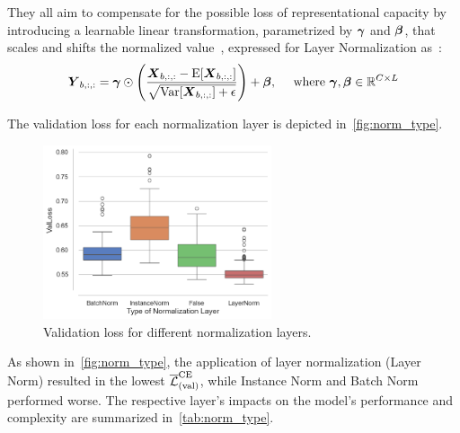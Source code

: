 They all aim to compensate for the possible loss of representational capacity by introducing a learnable linear
transformation, parametrized by \( \boldsymbol{\gamma} \) and \( \boldsymbol{\beta} \),
that scales and shifts the normalized value~\cite{wu2018group}, expressed for Layer Normalization as~\cite{PyTorchLayerNorm}:
\begin{equation}
    \boldsymbol{Y}_{b, :, :} = \boldsymbol{\gamma} \odot \left( \frac{\boldsymbol{X}_{b, :, :} - \mathrm{E}[\boldsymbol{X}_{b, :, :}]}{\sqrt{\operatorname{Var}[\boldsymbol{X}_{b, :, :}] + \epsilon}} \right) + \boldsymbol{\beta}, \quad \text { where } \boldsymbol{\gamma}, \boldsymbol{\beta} \in \mathbb{R}^{C \times L}
\end{equation}

The validation loss for each normalization layer is depicted in~\autoref{fig:norm_type}.
\begin{figure}[H]
    \centering
    \includegraphics[width=0.6\textwidth]{figures/06_ModelExploration/4_CNN/conv_norm_type.png}
    \caption{Validation loss for different normalization layers.}
    \label{fig:norm_type}
\end{figure}

As shown in~\autoref{fig:norm_type}, the application of layer normalization (Layer Norm) resulted in the lowest \( \overline{\mathcal{L}}_{(\text{val})}^{\text{CE}} \),
while Instance Norm and Batch Norm performed worse. The respective layer's impacts on the model's performance and complexity
are summarized in~\autoref{tab:norm_type}.

